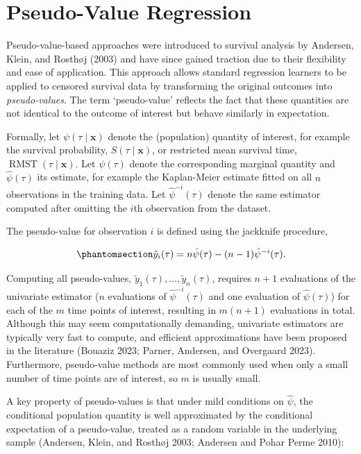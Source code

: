 \documentclass[
  letterpaper,
  krantz2]{style/krantz}
\begin{document}
\chapter{Pseudo-Value Regression}\label{sec-pseudo-value-reduction}

Pseudo-value-based approaches were introduced to survival analysis by
Andersen, Klein, and Rosthøj (2003) and have since gained traction due
to their flexibility and ease of application. This approach allows
standard regression learners to be applied to censored survival data by
transforming the original outcomes into
\emph{pseudo-values}. The term `pseudo-value'
reflects the fact that these quantities are not identical to the outcome
of interest but behave similarly in
expectation.

Formally, let \(\psi(\tau \mid \mathbf{x})\) denote the (population)
quantity of interest, for example the survival probability,
\(S(\tau \mid \mathbf{x})\), or restricted mean survival time,
\(\operatorname{RMST}(\tau \mid \mathbf{x})\). Let \(\psi(\tau)\) denote
the corresponding marginal quantity and \(\hat\psi(\tau)\) its estimate,
for example the Kaplan-Meier estimate fitted on all \(n\) observations
in the training data. Let \(\hat\psi^{-i}(\tau)\) denote the same
estimator computed after omitting the \(i\)th observation from the
dataset.

The pseudo-value for observation \(i\) is defined using the jackknife
procedure,

\begin{equation}\phantomsection\label{eq-pseudo-value}{
\tilde{y}_i(\tau) = n\hat\psi(\tau) - (n-1)\hat\psi^{-i}(\tau).
}\end{equation}

Computing all pseudo-values,
\(\tilde{y}_1(\tau), \ldots, \tilde{y}_n(\tau)\), requires \(n+1\)
evaluations of the univariate estimator (\(n\) evaluations of
\(\hat\psi^{-i}(\tau)\) and one evaluation of \(\hat\psi(\tau)\)) for
each of the \(m\) time points of interest, resulting in \(m(n+1)\)
evaluations in total. Although this may seem computationally demanding,
univariate estimators are typically very fast to compute, and efficient
approximations have been proposed in the literature (Bouaziz 2023;
Parner, Andersen, and Overgaard 2023). Furthermore, pseudo-value methods
are most commonly used when only a small number of time points are of
interest, so \(m\) is usually small.

A key property of pseudo-values is that under mild conditions on
\(\hat\psi\), the conditional population quantity is well approximated
by the conditional expectation of a pseudo-value, treated as a random
variable in the underlying sample (Andersen, Klein, and Rosthøj 2003;
Andersen and Pohar Perme 2010):
\end{document}
